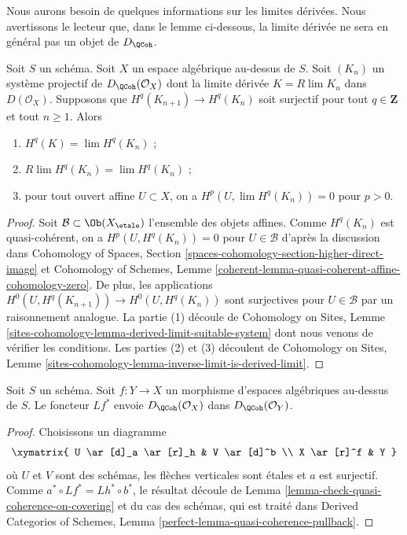 \noindent
Nous aurons besoin de quelques informations sur les limites dérivées. Nous avertissons le lecteur
que, dans le lemme ci-dessous, la limite dérivée ne sera en général pas
un objet de $D_\QCoh$.

\begin{lemma}
\label{lemma-Rlim-quasi-coherent}
Soit $S$ un schéma. Soit $X$ un espace algébrique au-dessus de $S$.
Soit $(K_n)$ un système projectif de
$D_\QCoh(\mathcal{O}_X)$ dont la limite dérivée
$K = R\lim K_n$ dans $D(\mathcal{O}_X)$. Supposons que $H^q(K_{n + 1}) \to H^q(K_n)$
soit surjectif pour tout $q \in \mathbf{Z}$ et tout $n \geq 1$.
Alors
\begin{enumerate}
\item $H^q(K) = \lim H^q(K_n)$ ;
\item $R\lim H^q(K_n) = \lim H^q(K_n)$ ;
\item pour tout ouvert affine $U \subset X$, on a
$H^p(U, \lim H^q(K_n)) = 0$ pour $p > 0$.
\end{enumerate}
\end{lemma}

\begin{proof}
Soit $\mathcal{B} \subset \Ob(X_\etale)$ l'ensemble des objets affines.
Comme $H^q(K_n)$ est quasi-cohérent, on a $H^p(U, H^q(K_n)) = 0$
pour $U \in \mathcal{B}$ d'après la discussion dans
Cohomology of Spaces, Section
\ref{spaces-cohomology-section-higher-direct-image}
et
Cohomology of Schemes, Lemme
\ref{coherent-lemma-quasi-coherent-affine-cohomology-zero}.
De plus, les applications $H^0(U, H^q(K_{n + 1})) \to H^0(U, H^q(K_n))$
sont surjectives pour $U \in \mathcal{B}$ par un raisonnement analogue.
La partie (1) découle de Cohomology on Sites, Lemme
\ref{sites-cohomology-lemma-derived-limit-suitable-system}
dont nous venons de vérifier les conditions.
Les parties (2) et (3) découlent de
Cohomology on Sites, Lemme
\ref{sites-cohomology-lemma-inverse-limit-is-derived-limit}.
\end{proof}

\begin{lemma}
\label{lemma-quasi-coherence-pullback}
Soit $S$ un schéma.
Soit $f : Y \to X$ un morphisme d'espaces algébriques au-dessus de $S$.
Le foncteur $Lf^*$ envoie $D_\QCoh(\mathcal{O}_X)$
dans $D_\QCoh(\mathcal{O}_Y)$.
\end{lemma}

\begin{proof}
Choisissons un diagramme
$$
\xymatrix{
U \ar[d]_a \ar[r]_h & V \ar[d]^b \\
X \ar[r]^f & Y
}
$$
où $U$ et $V$ sont des schémas, les flèches verticales sont étales et
$a$ est surjectif. Comme $a^* \circ Lf^* = Lh^* \circ b^*$, le résultat
découle de
Lemma \ref{lemma-check-quasi-coherence-on-covering}
et du cas des schémas, qui est traité dans
Derived Categories of Schemes, Lemma
\ref{perfect-lemma-quasi-coherence-pullback}.
\end{proof}

